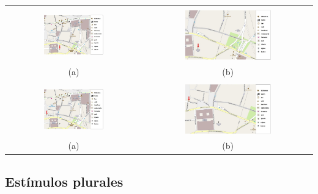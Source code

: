 \noindent
\begin{center}
\begin{tabular}{c c}
& \\
\includegraphics[width=0.46\textwidth]{images/corpus/mapa6.png} & \includegraphics[width=0.53\textwidth]{images/corpus/mapa16.png} \\
(a) & (b) \\
& \\
\includegraphics[width=0.46\textwidth]{images/corpus/mapa7.png} & \includegraphics[width=0.53\textwidth]{images/corpus/mapa17.png} \\
(a) & (b) \\
\end{tabular}
\end{center}




\subsection{Est\'imulos plurales}

